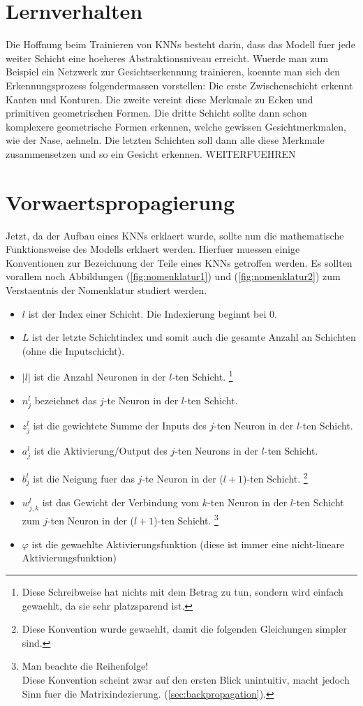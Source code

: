 \cite{wiki:kuenstliches_neuronales_netz}
\cite{Nielsen}

\section{Lernverhalten}
Die Hoffnung beim Trainieren von KNNs besteht darin, dass das Modell fuer jede
weiter Schicht eine hoeheres Abstraktionsniveau erreicht. Wuerde man zum
Beispiel ein Netzwerk zur Gesichtserkennung trainieren, koennte man sich den
Erkennungsprozess folgendermassen vorstellen: Die erste Zwischenschicht erkennt
Kanten und Konturen. Die zweite vereint diese Merkmale zu Ecken und primitiven
geometrischen Formen. Die dritte Schicht sollte dann schon komplexere
geometrische Formen erkennen, welche gewissen Gesichtmerkmalen, wie der Nase, aehneln. Die letzten Schichten soll dann alle diese
Merkmale zusammensetzen und so ein Gesicht erkennen.
WEITERFUEHREN

\section{Vorwaertspropagierung}
Jetzt, da der Aufbau eines KNNs erklaert wurde, sollte nun die mathematische Funktionsweise
des Modells erklaert werden. Hierfuer muessen einige Konventionen zur
Bezeichnung der Teile eines KNNs getroffen werden. Es sollten vorallem noch
Abbildungen (\ref{fig:nomenklatur1}) und (\ref{fig:nomenklatur2}) zum
Verstaentnis der Nomenklatur studiert werden.
\begin{itemize}
\item{$l$ ist der Index einer Schicht. Die Indexierung beginnt bei 0.}
\item{$L$ ist der letzte Schichtindex und somit auch die gesamte Anzahl an
    Schichten (ohne die Inputschicht).}
\item{$|l|$ ist die Anzahl Neuronen in der $l$-ten Schicht.
    \footnote{
      Diese Schreibweise hat nichts mit dem Betrag zu tun, sondern wird einfach
      gewaehlt, da sie sehr platzsparend ist.
    }
  }
\item{$n_j^l$ bezeichnet das $j$-te Neuron in der $l$-ten Schicht.}
\item{$z_j^l$ ist die gewichtete Summe der Inputs des $j$-ten Neuron in der $l$-ten Schicht.}
\item{$a_j^l$ ist die Aktivierung/Output des $j$-ten Neurons in der $l$-ten Schicht.}
\item{$b_j^l$ ist die Neigung fuer das $j$-te Neuron in der ($l+1$)-ten Schicht.
    \footnote{
      Diese Konvention wurde gewaehlt, damit die folgenden Gleichungen simpler sind.
    }
  }
\item{$w_{j,k}^l$ ist das Gewicht der Verbindung vom $k$-ten Neuron
    in der $l$-ten Schicht zum $j$-ten Neuron in der ($l+1$)-ten Schicht.
    \footnote{
      Man beachte die Reihenfolge!\\
      Diese Konvention scheint zwar auf den ersten Blick unintuitiv, macht jedoch
      Sinn fuer die Matrixindezierung.
      (\ref{sec:backpropagation}).
    }
  }
\item{$\varphi$ ist die gewaehlte Aktivierungsfunktion (diese ist immer eine
    nicht-lineare Aktivierungsfunktion)}
\end{itemize}

